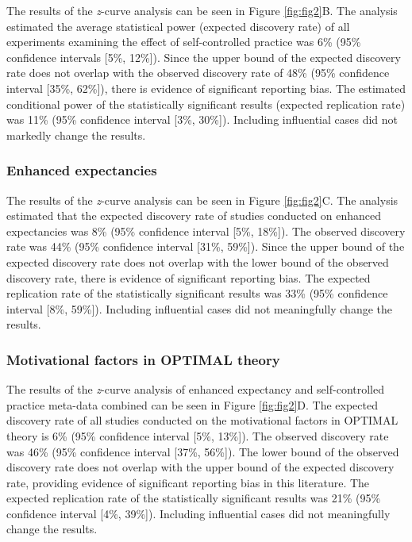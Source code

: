 \documentclass[
  doc, donotrepeattitle,floatsintext]{apa7}
\begin{document}
The results of the \emph{z}-curve analysis can be seen in Figure \ref{fig:fig2}B. The analysis estimated the average statistical power (expected discovery rate) of all experiments examining the effect of self-controlled practice was 6\% (95\% confidence intervals {[}5\%, 12\%{]}). Since the upper bound of the expected discovery rate does not overlap with the observed discovery rate of 48\% (95\% confidence interval {[}35\%, 62\%{]}), there is evidence of significant reporting bias. The estimated conditional power of the statistically significant results (expected replication rate) was 11\% (95\% confidence interval {[}3\%, 30\%{]}). Including influential cases did not markedly change the results.

\hypertarget{enhanced-expectancies-1}{%
\subsubsection{Enhanced expectancies}\label{enhanced-expectancies-1}}

The results of the \emph{z}-curve analysis can be seen in Figure \ref{fig:fig2}C. The analysis estimated that the expected discovery rate of studies conducted on enhanced expectancies was 8\% (95\% confidence interval {[}5\%, 18\%{]}). The observed discovery rate was 44\% (95\% confidence interval {[}31\%, 59\%{]}). Since the upper bound of the expected discovery rate does not overlap with the lower bound of the observed discovery rate, there is evidence of significant reporting bias. The expected replication rate of the statistically significant results was 33\% (95\% confidence interval {[}8\%, 59\%{]}). Including influential cases did not meaningfully change the results.

\hypertarget{motivational-factors-in-optimal-theory}{%
\subsubsection{Motivational factors in OPTIMAL theory}\label{motivational-factors-in-optimal-theory}}

The results of the \emph{z}-curve analysis of enhanced expectancy and self-controlled practice meta-data combined can be seen in Figure \ref{fig:fig2}D. The expected discovery rate of all studies conducted on the motivational factors in OPTIMAL theory is 6\% (95\% confidence interval {[}5\%, 13\%{]}). The observed discovery rate was 46\% (95\% confidence interval {[}37\%, 56\%{]}). The lower bound of the observed discovery rate does not overlap with the upper bound of the expected discovery rate, providing evidence of significant reporting bias in this literature. The expected replication rate of the statistically significant results was 21\% (95\% confidence interval {[}4\%, 39\%{]}). Including influential cases did not meaningfully change the results.
\end{document}
